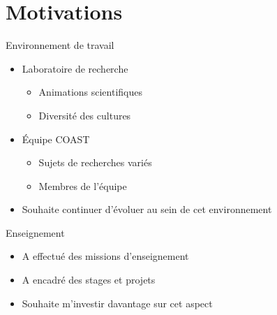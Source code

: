\documentclass[xcolor=table]{beamer}
\begin{document}


\section{Motivations}

\begin{frame}{Environnement de travail}
  \begin{itemize}
    \item Laboratoire de recherche
      \begin{itemize}
      \item Animations scientifiques
      \item Diversité des cultures
      \end{itemize}
    \item Équipe COAST
      \begin{itemize}
      \item Sujets de recherches variés
      \item Membres de l'équipe
      \end{itemize}
    \item Souhaite continuer d'évoluer au sein de cet environnement
  \end{itemize}
\end{frame}

\begin{frame}{Enseignement}
  \begin{itemize}
  \item A effectué des missions d'enseignement
  \item A encadré des stages et projets
  \item Souhaite m'investir davantage sur cet aspect
  \end{itemize}
\end{frame}
\end{document}
